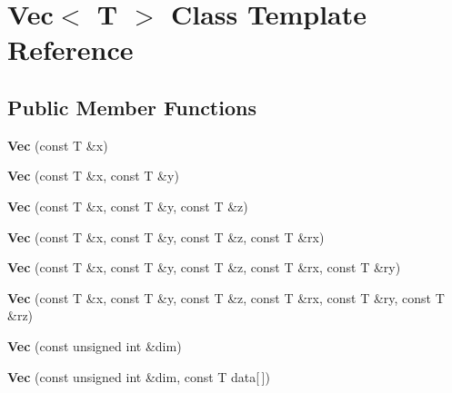 \hypertarget{class_vec}{\section{Vec$<$ T $>$ Class Template Reference}
\label{class_vec}
}
\subsection*{Public Member Functions}
\begin{DoxyCompactItemize}
\item 
\hypertarget{class_vec_a18b36a6dca8e132738970a16d13082df}{{\bfseries Vec} (const T \&x)}\label{class_vec_a18b36a6dca8e132738970a16d13082df}

\item 
\hypertarget{class_vec_a4221f98304b3c765c83fd37b93e702c4}{{\bfseries Vec} (const T \&x, const T \&y)}\label{class_vec_a4221f98304b3c765c83fd37b93e702c4}

\item 
\hypertarget{class_vec_a5ad45cc16f495d26737b925c345137e5}{{\bfseries Vec} (const T \&x, const T \&y, const T \&z)}\label{class_vec_a5ad45cc16f495d26737b925c345137e5}

\item 
\hypertarget{class_vec_a141b06b3d545325e4d1337f496d69dc8}{{\bfseries Vec} (const T \&x, const T \&y, const T \&z, const T \&rx)}\label{class_vec_a141b06b3d545325e4d1337f496d69dc8}

\item 
\hypertarget{class_vec_a7b51eeb80aa7d9a38eebb3825e31a91f}{{\bfseries Vec} (const T \&x, const T \&y, const T \&z, const T \&rx, const T \&ry)}\label{class_vec_a7b51eeb80aa7d9a38eebb3825e31a91f}

\item 
\hypertarget{class_vec_a424a599b41e6cb30151965cbf2592e87}{{\bfseries Vec} (const T \&x, const T \&y, const T \&z, const T \&rx, const T \&ry, const T \&rz)}\label{class_vec_a424a599b41e6cb30151965cbf2592e87}

\item 
\hypertarget{class_vec_a01bc377e20fbf5a9a3a849c83caca1e7}{{\bfseries Vec} (const unsigned int \&dim)}\label{class_vec_a01bc377e20fbf5a9a3a849c83caca1e7}

\item 
\hypertarget{class_vec_a482065701497995521b79c62f36b9b47}{{\bfseries Vec} (const unsigned int \&dim, const T data\mbox{[}$\,$\mbox{]})}\label{class_vec_a482065701497995521b79c62f36b9b47}


\end{DoxyCompactItemize}
